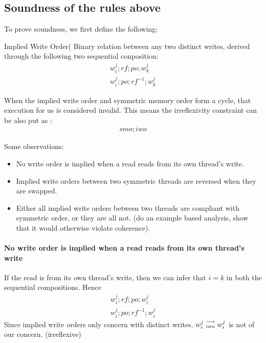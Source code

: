 \subsection{Soundness of the rules above}

    To prove soundness, we first define the following: 

    \begin{definition}{Implied Write Order(}
        Binary relation between any two distinct writes, derived through the following two sequential conposition:  
        \begin{align*}
            w_i^j;rf;po;w_k^j \\
            w_i^j;po;rf^{-1};w_k^j
        \end{align*}
    \end{definition}

    When the implied write order and symmetric memory order form a cycle, that execution for us is considered invalid. This means the irreflexivity constraint can be also put as :
    \begin{align*}
        smo;iwo
    \end{align*}

    Some observations:
    \begin{itemize}
        \item No write order is implied when a read reads from its own thread's write.
        \item Implied write orders between two symmetric threads are reversed when they are swapped.
        \item Either all implied write orders between two threads are compliant with symmetric order, or they are all not. (do an example based analysis, show that it would otherwise violate coherence).
    \end{itemize}

    \paragraph{No write order is implied when a read reads from its own thread's write}
        If the read is from its own thread's write, then we can infer that $i=k$ in both the sequential compositions. Hence  
        \begin{align*}
            w_i^j;rf;po;w_i^j \\
            w_i^j;po;rf^{-1};w_i^j
        \end{align*} 
        Since implied write orders only concern with distinct writes, $w_i^j\stackrel{\longrightarrow}{_{iwo}}w_i^j$ is not of our concern. (irreflexive)

